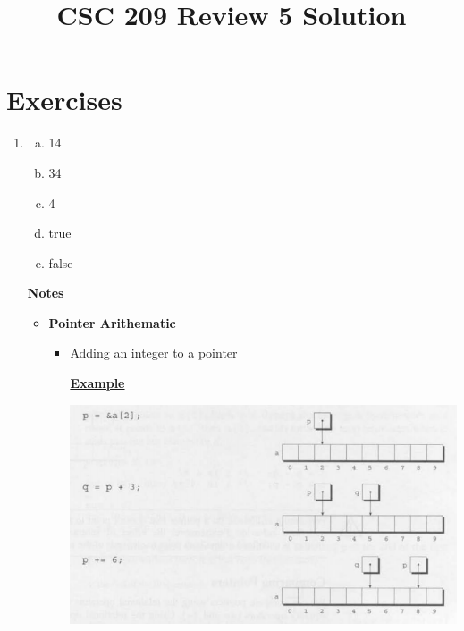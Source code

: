 \documentclass[12pt]{article}
\begin{document}
\title{CSC 209 Review 5 Solution}
\maketitle

\bigskip

\section{Exercises}

\begin{enumerate}[1.]
    \item

    \bigskip

    \begin{enumerate}[a)]
        \item 14
        \item 34
        \item 4
        \item true
        \item false
    \end{enumerate}

    \underline{\textbf{Notes}}

    \begin{itemize}
        \item \textbf{Pointer Arithematic}

        \begin{itemize}
            \item Adding an integer to a pointer

            \bigskip

            \underline{\textbf{Example}}

            \begin{center}
            \includegraphics[width=\linewidth]{images/review_5_solution_1.png}
            \end{center}


\end{itemize}
\end{itemize}
\end{enumerate}
\end{document}
